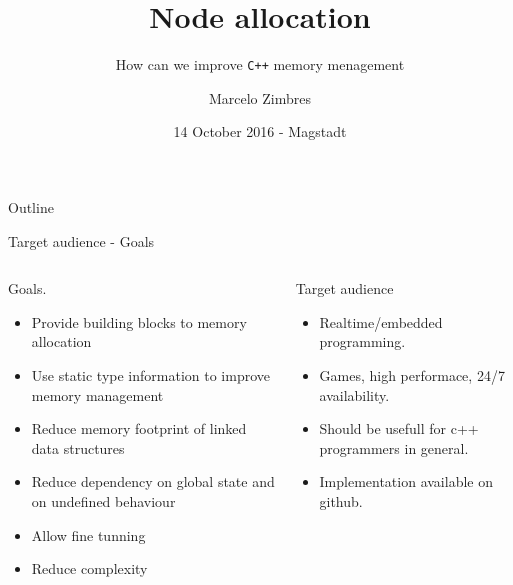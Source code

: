 \documentclass[10pt,aspectratio=169]{beamer}
\title[] {Node allocation}
\subtitle[] {How can we improve \texttt{C++} memory menagement}
\author[] {Marcelo Zimbres}
\institute[Marcelo Zimbres - Software Developer - Physicist]
{
  Presentation to WG21-SG14
}
\date[15 October 2016 - Magstadt - Germany] {14 October 2016 - Magstadt}
\begin{document}
\begin{frame}
  \titlepage
\end{frame}

\begin{frame}{Outline}
  \tableofcontents[pausesections]
\end{frame}



\begin{frame}[t]{Target audience - Goals}{}
\begin{columns}
\begin{column}{0.5\textwidth}
Goals.
\begin{itemize}
    \item Provide building blocks to memory allocation
    \item Use static type information to improve memory management
    \item Reduce memory footprint of linked data structures
    \item Reduce dependency on global state and on undefined behaviour
    \item Allow fine tunning
    \item Reduce complexity
\end{itemize}
\end{column}

\begin{column}{0.5\textwidth}
Target audience
\begin{itemize}
    \item Realtime/embedded programming.
    \item Games, high performace, 24/7 availability.
    \item Should be usefull for c++ programmers in general.
    \item Implementation available on github.
\end{itemize}
\end{column}
\end{columns}
\end{frame}
\end{document}
